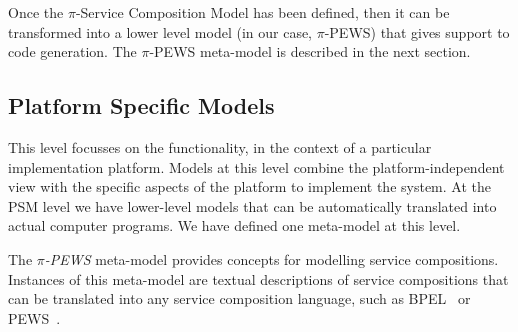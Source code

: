 Once the $\pi$-Service Composition Model has been defined, then it can be transformed into a lower level model (in our case, $\pi$-PEWS) that gives support to code generation. 
The $\pi$-PEWS  meta-model is described in the next section. 


\subsection{Platform Specific Models}

This level focusses on the functionality, in the context of a particular implementation platform.
Models at this level combine the platform-independent view with the specific aspects of the platform to implement the system. At the PSM level we have lower-level models that can be automatically translated into actual computer programs. 
We have defined one meta-model at this level.

The \textit{$\pi$-PEWS} meta-model provides concepts for modelling service compositions. 
Instances of this meta-model are textual descriptions of service compositions that can be translated into any service composition language, such as BPEL~\cite{bpel03} or PEWS~\cite{BaCAM05,Placido2010LTPD}.

